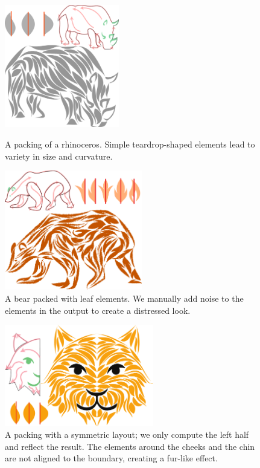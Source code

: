 \begin{figure}[t!]
\centering
\includegraphics[width=5cm]{figures/flowpak/result_02.pdf} %
\caption{\label{result_rhino}
A packing of a rhinoceros.  Simple teardrop-shaped 
elements lead to variety in size and curvature.}
\bigskip
\includegraphics[width=6cm]{figures/flowpak/bear_leaves.pdf} %
\caption{\label{result_bear_leaves}
	A bear packed with leaf elements.  We manually add noise to the 
	elements in the output to create a distressed look.}
\end{figure}

\begin{figure} %
\centering
\includegraphics[width=6.5cm]{figures/flowpak/cat.pdf}
\caption{A packing with a symmetric layout; we only compute the left half and reflect the result. The elements around the cheeks and the chin are not aligned to the boundary, creating a fur-like effect.}
\label{result_cat}
\end{figure}


